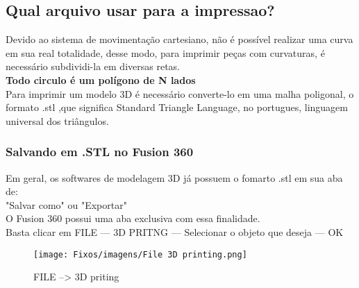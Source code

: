 \subsection{Qual arquivo usar para a impressao?}



Devido ao sistema de movimentação cartesiano, não é possível realizar uma curva em sua real totalidade, desse modo, para imprimir peças com curvaturas, é necessário subdividi-la em diversas retas.\\[0.4cm]



\textbf{\large Todo circulo é um polígono de N lados}\\[0.3cm]



Para imprimir um modelo 3D é necessário converte-lo em uma malha poligonal, o formato .stl ,que significa Standard Triangle Language, no portugues, linguagem universal dos triângulos.\\[0.3cm]

\subsubsection{Salvando em .STL no Fusion 360}



Em geral, os softwares de modelagem 3D já possuem o fomarto .stl em sua aba de:\\[0.3 cm]

"Salvar como" ou "Exportar"\\[0.2cm]



O Fusion 360 possui uma aba exclusiva com essa finalidade.\\[0.3cm]



Basta clicar em FILE --- 3D PRITNG --- Selecionar o objeto que deseja --- OK\\[2cm]



\begin{figure}[h!]

    \centering

    \texttt{[image: Fixos/imagens/File 3D printing.png]}

    \caption{FILE --> 3D priting}

    \label{fig:my_label}

\end{figure}



